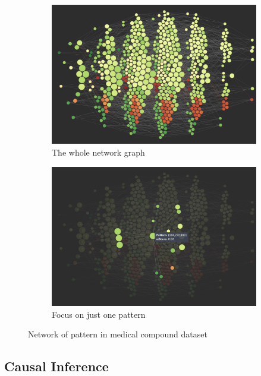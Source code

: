 \begin{figure}[h]
\begin{subfigure}{.5\textwidth}
  \centering
  \captionsetup{justification=centering}
  \includegraphics[width=.8\linewidth]{Report-latex/tex_files/pics/network21.png}  
  \caption{The whole network graph}
  \label{fig:sub-first}
\end{subfigure}
\begin{subfigure}{.5\textwidth}
  \centering
  \captionsetup{justification=centering}
  \includegraphics[width=1\linewidth]{Report-latex/tex_files/pics/network22.png}  
  \caption{Focus on just one pattern}
  \label{fig:sub-second}
\end{subfigure}
\captionsetup{justification=centering}
\caption{Network of pattern in medical compound dataset \cite{networkgraph}}
\label{fig:network-graph}
\end{figure}

\subsection{Causal Inference}

